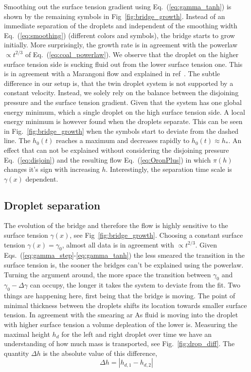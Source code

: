 \documentclass[twocolumn,amsmath,amssymb,showpacs,pre,nofootinbib,superscriptaddress]{revtex4-1} %
\begin{document}
Smoothing out the surface tension gradient using Eq.~(\ref{eq:gamma_tanh}) is shown by the remaining symbols in Fig~\ref{fig:bridge_growth}.
Instead of an immediate separation of the droplets and independent of the smoothing width Eq.~(\ref{eq:smoothing}) (different colors and symbols), the bridge starts to grow initially.
More surprisingly, the growth rate is in agreement with the powerlaw $\propto t^{2/3}$ of Eq.~(\ref{eq:coal_powerlaw}).
We observe that the droplet on the higher surface tension side is sucking fluid out from the lower surface tension one.
This is in agreement with a Marangoni flow and explained in ref~\cite{PhysRevLett.109.066103}.
The subtle difference in our setup is, that the twin droplet system is not supported by a constant velocity.
Instead, we solely rely on the balance between the disjoining pressure and the surface tension gradient.
Given that the system has one global energy minimum, which a single droplet on the high surface tension side.
A local energy minimum is however found when the droplets separate.
This can be seen in Fig.~\ref{fig:bridge_growth} when the symbols start to deviate from the dashed line.
The $h_0(t)$ reaches a maximum and decreases rapidly to $h_0(t) \approx h_{\ast}$.
An effect that can not be explained without considering the disjoining pressure Eq.~(\ref{eq:disjoin}) and the resulting flow Eq.~(\ref{eq:OronPlus}) in which $\pi(h)$ changes it's sign with increasing $h$.
Interestingly, the separation time scale is $\gamma(x)$ dependent.

\subsection{Droplet separation}\label{subsec:separation}
The evolution of the bridge and therefore the flow is highly sensitive to the surface tension $\gamma(x)$, see Fig~\ref{fig:bridge_growth}.
Choosing a constant surface tension $\gamma(x) = \gamma_0$, almost all data is in agreement with $\propto t^{2/3}$.
Given Eqs.~(\ref{eq:gamma_step}-\ref{eq:gamma_tanh}) the less smeared the transition in the surface tension is, the sooner the bridges can't be explained using the powerlaw.
Turning the argument around, the more space the transition between $\gamma_0$ and $\gamma_0-\Delta\gamma$ can occupy, the longer it takes the system to deviate from the fit.
Two things are happening here, first being that the bridge is moving.
The point of minimal thickness between the droplets shifts its location towards smaller surface tension.
In agreement with the smearing ar
As fluid is moving into the droplet with higher surface tension a volume depleation of the lower is.
Measuring the maximal height $h_d$ for the left and right droplet over time we have an understanding of how much mass is transported, see Fig.~\ref{fig:drop_diff}. 
The quantity $\Delta h$ is the absolute value of this difference,
\begin{equation}\label{eq:drop_diff_h}
    \Delta h = |h_{d,1} - h_{d,2}|
\end{equation}
\end{document}

